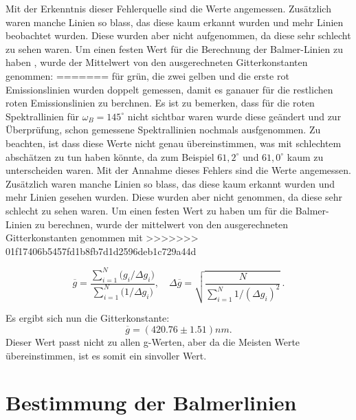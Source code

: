 Mit der Erkenntnis dieser Fehlerquelle sind die Werte angemessen.
Zusätzlich waren manche Linien so blass, das diese kaum erkannt wurden und mehr Linien beobachtet wurden. 
Diese wurden aber nicht aufgenommen, da diese sehr schlecht zu sehen waren. 
Um einen festen Wert für die Berechnung der Balmer-Linien zu haben , wurde der Mittelwert von den ausgerechneten Gitterkonstanten genommen:
=======
für grün, die zwei gelben und die erste rot Emissionslinien wurden doppelt gemessen, damit es ganauer für die restlichen roten Emissionslinien zu berchnen.
Es ist zu bemerken, dass für die roten Spektrallinien für $\omega_B = 145^\circ$ nicht sichtbar waren wurde diese geändert und zur Überprüfung, schon gemessene Spektrallinien nochmals ausfgenommen. 
Zu beachten, ist dass diese Werte nicht genau übereinstimmen, was mit schlechtem abschätzen zu tun haben könnte, da zum Beispiel $61,2^\circ$ und $61,0^\circ$ kaum zu unterscheiden waren.
Mit der Annahme dieses Fehlers sind die Werte angemessen.
Zusätzlich waren manche Linien so blass, das diese kaum erkannt wurden und mehr Linien gesehen wurden. 
Diese wurden aber nicht genommen, da diese sehr schlecht zu sehen waren. 
Um einen festen Wert zu haben um für die Balmer-Linien zu berechnen, wurde der mittelwert von den ausgerechneten Gitterkonstanten genommen mit 
>>>>>>> 01f17406b5457fd1b8fb7d1d2596deb1c729a44d

\begin{equation}
  \overline{g}
  = \frac{\sum_{i=1}^{N} \bigl(g_i/\Delta g_i\bigr)}
         {\sum_{i=1}^{N} \bigl(1/\Delta g_i\bigr)},
  \quad
  \Delta\overline{g}
  = \sqrt{\frac{N}{\sum_{i=1}^{N} 1/(\Delta g_i)^{2}}}\,.
\end{equation}

Es ergibt sich nun die Gitterkonstante:
\begin{equation}
    \overline{g} = (420.76 \pm 1.51) nm.
    \label{gitterkon}
\end{equation}
Dieser Wert passt nicht zu allen g-Werten, aber da die Meisten Werte übereinstimmen, ist es somit ein sinvoller Wert. 

\section{Bestimmung der Balmerlinien} \label{Bestimmung der Balmer}

